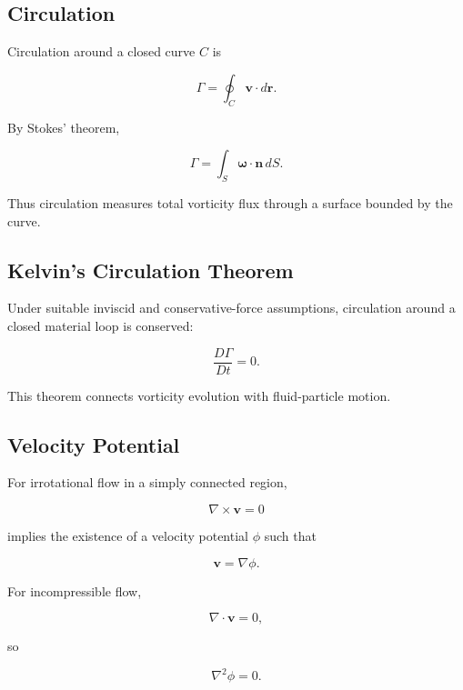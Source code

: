 \subsection{Circulation}
\label{subsec:fluid-circulation}

Circulation around a closed curve \(C\) is

\[
\boxed{
\Gamma
=
\oint_C
\mathbf{v}\cdot d\mathbf{r}.
}
\]

By Stokes' theorem,

\[
\boxed{
\Gamma
=
\int_S
\boldsymbol{\omega}\cdot\mathbf{n}\,dS.
}
\]

Thus circulation measures total vorticity flux through a surface bounded by
the curve.

\subsection{Kelvin's Circulation Theorem}
\label{subsec:kelvin-circulation}

Under suitable inviscid and conservative-force assumptions, circulation
around a closed material loop is conserved:

\[
\boxed{
\frac{D\Gamma}{Dt}
=
0.
}
\]

This theorem connects vorticity evolution with fluid-particle motion.

\subsection{Velocity Potential}
\label{subsec:velocity-potential}

For irrotational flow in a simply connected region,

\[
\boxed{
\nabla\times\mathbf{v}=0
}
\]

implies the existence of a velocity potential \(\phi\) such that

\[
\boxed{
\mathbf{v}
=
\nabla\phi.
}
\]

For incompressible flow,

\[
\nabla\cdot\mathbf{v}=0,
\]

so

\[
\boxed{
\nabla^2\phi=0.
}
\]

